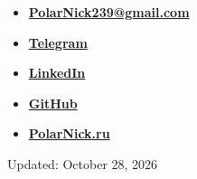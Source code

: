 \documentclass[11pt,oneside]{article}
\newcommand{\hhref}[2]{\href{#1}{\color{blue}#2}}
\begin{document}
\begin{itemize}
    \item{\textbf{\hhref{mailto:PolarNick239@gmail.com}{PolarNick239@gmail.com}}}

    \item{\textbf{\hhref{https://t.me/polarnick239}{Telegram}}}

    \item{\textbf{\hhref{https://www.linkedin.com/in/nikolai-poliarnyi-61393b7b}{LinkedIn}}}

    \item{\textbf{\hhref{https://github.com/PolarNick239}{GitHub}}}

    \item{\textbf{\hhref{http://polarnick239.github.io/index_ru.html}{PolarNick.ru}}}

\end{itemize}

Updated: October 28, 2026
\end{document}
